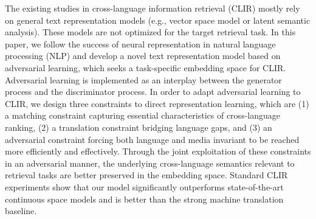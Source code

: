 The existing studies in cross-language information retrieval (CLIR) mostly rely on general text representation models (e.g., vector space model or latent semantic analysis). These models are not optimized for the target retrieval task. In this paper, we follow the success of neural representation in natural language processing (NLP) and develop a novel text representation model based on adversarial learning, which seeks a task-specific embedding space for CLIR. Adversarial learning is implemented as an interplay between the generator process and the discriminator process. In order to adapt adversarial learning to CLIR, we design three constraints to direct representation learning, which are (1) a matching constraint capturing essential characteristics of cross-language ranking, (2) a translation constraint bridging language gaps, and (3) an adversarial constraint forcing both language and media invariant to be reached more efficiently and effectively. Through the joint exploitation of these constraints in an adversarial manner, the underlying cross-language semantics relevant to retrieval tasks are better preserved in the embedding space. Standard CLIR experiments show that our model significantly outperforms state-of-the-art continuous space models and is better than the strong machine translation baseline.
